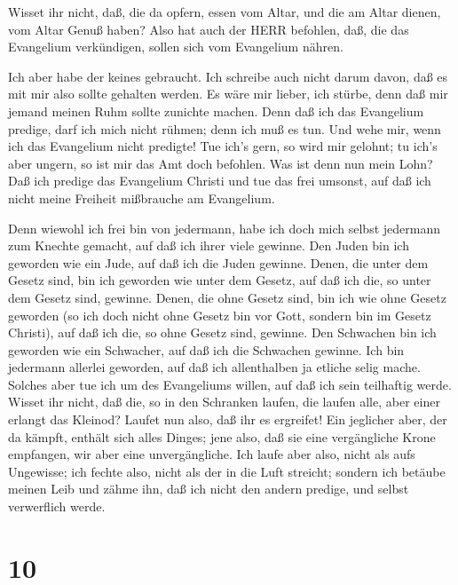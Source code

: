  Wisset ihr nicht, daß, die da opfern, essen vom Altar, und
die am Altar dienen, vom Altar Genuß haben?  Also hat auch
der HERR befohlen, daß, die das Evangelium verkündigen, sollen sich vom
Evangelium nähren.

 Ich aber habe der keines gebraucht. Ich schreibe auch
nicht darum davon, daß es mit mir also sollte gehalten werden. Es wäre
mir lieber, ich stürbe, denn daß mir jemand meinen Ruhm sollte zunichte
machen.  Denn daß ich das Evangelium predige, darf ich mich
nicht rühmen; denn ich muß es tun. Und wehe mir, wenn ich das Evangelium
nicht predigte!  Tue ich's gern, so wird mir gelohnt; tu
ich's aber ungern, so ist mir das Amt doch befohlen.  Was
ist denn nun mein Lohn? Daß ich predige das Evangelium Christi und tue
das frei umsonst, auf daß ich nicht meine Freiheit mißbrauche am
Evangelium.

 Denn wiewohl ich frei bin von jedermann, habe ich doch
mich selbst jedermann zum Knechte gemacht, auf daß ich ihrer viele
gewinne.  Den Juden bin ich geworden wie ein Jude, auf daß
ich die Juden gewinne. Denen, die unter dem Gesetz sind, bin ich
geworden wie unter dem Gesetz, auf daß ich die, so unter dem Gesetz
sind, gewinne.  Denen, die ohne Gesetz sind, bin ich wie
ohne Gesetz geworden (so ich doch nicht ohne Gesetz bin vor Gott,
sondern bin im Gesetz Christi), auf daß ich die, so ohne Gesetz sind,
gewinne.  Den Schwachen bin ich geworden wie ein Schwacher,
auf daß ich die Schwachen gewinne. Ich bin jedermann allerlei geworden,
auf daß ich allenthalben ja etliche selig mache.  Solches
aber tue ich um des Evangeliums willen, auf daß ich sein teilhaftig
werde.  Wisset ihr nicht, daß die, so in den Schranken
laufen, die laufen alle, aber einer erlangt das Kleinod? Laufet nun
also, daß ihr es ergreifet!  Ein jeglicher aber, der da
kämpft, enthält sich alles Dinges; jene also, daß sie eine vergängliche
Krone empfangen, wir aber eine unvergängliche.  Ich laufe
aber also, nicht als aufs Ungewisse; ich fechte also, nicht als der in
die Luft streicht;  sondern ich betäube meinen Leib und
zähme ihn, daß ich nicht den andern predige, und selbst verwerflich
werde.

\hypertarget{section-9}{%
\section{10}\label{section-9}}

